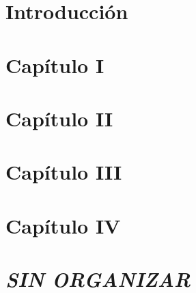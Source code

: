 \documentclass[a4paper,12pt,titlepage]{article}
\begin{document}
  \thispagestyle{empty} %
  \caratula
  \newpage

  \newpage

  \setcounter{secnumdepth}{0}
  \setcounter{tocdepth}{3}
  \setcounter{page}{1}
  
  \newpage
  \tableofcontents
  \newpage

  \section{Introducción}
  
  \newpage
  \setcounter{secnumdepth}{3}
  \section{Capítulo I}
  
  \newpage
  
  \newpage
  \section{Capítulo II}
  
  \newpage
  \section{Capítulo III}
  
  \newpage
  \section{Capítulo IV}
  
  \newpage

  \section{\textit{SIN ORGANIZAR}}
  
  \newpage

  \appendix
  \newpage
  
  \newpage
  
  \newpage
  
  
  \newpage
  \printglossary[title={Glosario de términos}]
  \newpage
  \listoffigures
  \newpage
  \listoftables
\end{document}
